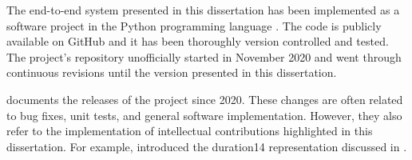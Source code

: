 
The end-to-end system presented in this dissertation has
been implemented as a software project in the Python
programming language \parencite{vanrossum2007python}. The
code is publicly available on GitHub and it has been
thoroughly version controlled and tested. The project's
repository unofficially started in November 2020 and went
through continuous revisions until the version presented in
this dissertation.

 documents the releases of the project
since 2020. These changes are often related to bug fixes,
unit tests, and general software implementation. However,
they also refer to the implementation of intellectual
contributions highlighted in this dissertation. For example,
 introduced the \gls{duration14} representation
discussed in .
